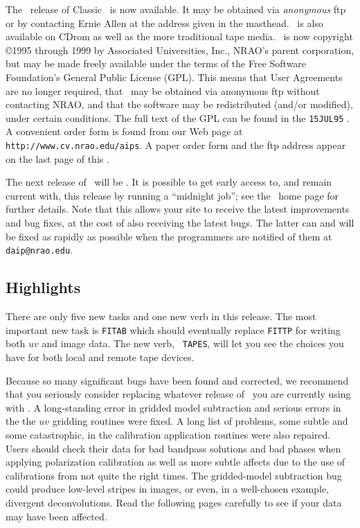 The \AIPRELEASE\ release of Classic \AIPS\ is now available.  It may
be obtained via \emph{anonymous} ftp or by contacting Ernie Allen at
the address given in the masthead.  \RELEASENAME\ is also available
on CDrom as well as the more traditional tape media.  \AIPS\ is now
copyright \copyright 1995 through 1999 by Associated Universities,
Inc., NRAO's parent corporation, but may be made freely available
under the terms of the Free Software Foundation's General Public
License \hbox{(GPL)}.  This means that User Agreements are no longer
required, that \AIPS\ may be obtained via anonymous ftp without
contacting NRAO, and that the software may be redistributed (and/or
modified), under certain conditions.  The full text of the GPL can be
found in the \texttt{15JUL95} \Aipsletter.  A convenient order form is
found from our Web page at {\tt http://www.cv.nrao.edu/aips}.  A paper
order form and the ftp address appear on the last page of this
\Aipsletter.

The next release of \AIPS\ will be \NEXTNAME\@.  It is possible
to get early access to, and remain current with, this release by
running a ``midnight job''; see the \AIPS\ home page for further
details.  Note that this allows your site to receive the latest
improvements and bug fixes, at the cost of also receiving the latest
bugs.  The latter can and will be fixed as rapidly as possible when
the programmers are notified of them at \texttt{daip@nrao.edu}.

\subsection{Highlights}

There are only five new tasks and one new verb in this release.  The
most important new task is {\tt FITAB} which should eventually replace
{\tt FITTP} for writing both $uv$ and image data.  The new verb, {\tt
TAPES}, will let you see the choices you have for both local and
remote tape devices.

Because so many significant bugs have been found and corrected, we
recommend that you seriously consider replacing whatever release of
\AIPS\ you are currently using with \RELEASENAME\@.  A long-standing
error in gridded model subtraction and serious errors in the the $uv$
gridding routines were fixed.  A long list of problems, some subtle
and some catastrophic, in the calibration application routines were
also repaired.  Users should check their data for bad bandpass
solutions and bad phases when applying polarization calibration as
well as more subtle affects due to the use of calibrations from not
quite the right times.  The gridded-model subtraction bug could
produce low-level stripes in images, or even, in a well-chosen
example, divergent deconvolutions.  Read the following pages carefully
to see if your data may have been affected.


